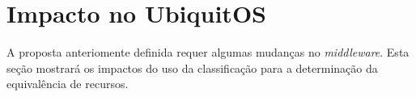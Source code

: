 \section{Impacto no UbiquitOS}
\label{sec:impactoUOS}

A proposta anteriomente definida requer algumas mudanças no \emph{middleware}. Esta seção mostrará os impactos do uso da classificação para a determinação da equivalência de recursos.




